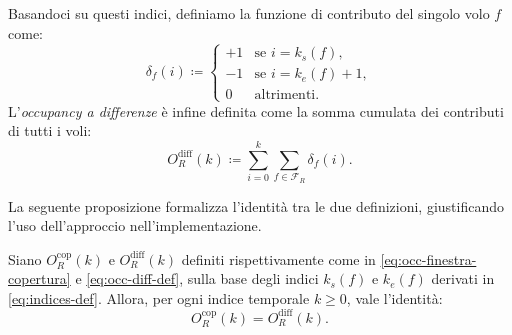 Basandoci su questi indici, definiamo la funzione di contributo del singolo volo \(f\) come:
\begin{equation*}
    \delta_f(i) \coloneqq
    \begin{cases}
    +1 & \text{se } i = k_s(f), \\
    -1 & \text{se } i = k_e(f) + 1, \\
    0  & \text{altrimenti}.
    \end{cases}
\end{equation*}
L'\emph{occupancy a differenze} è infine definita come la somma cumulata dei contributi di tutti i voli:
\begin{equation}
    \label{eq:occ-diff-def}
    O_R^{\text{diff}}(k) \coloneqq \sum_{i=0}^k \sum_{f \in \mathcal{F}_R} \delta_f(i).
\end{equation}

La seguente proposizione formalizza l'identità tra le due definizioni, giustificando l'uso dell'approccio nell'implementazione.
    
\begin{proposition}
\label{prop:occupancy-equivalence}
Siano \(O_R^{\text{cop}}(k)\) e \(O_R^{\text{diff}}(k)\) definiti rispettivamente come in \eqref{eq:occ-finestra-copertura} e \eqref{eq:occ-diff-def}, sulla base degli indici \(k_s(f)\) e \(k_e(f)\) derivati in \eqref{eq:indices-def}.
Allora, per ogni indice temporale \(k \ge 0\), vale l'identità:
\begin{equation}
    O_R^{\text{cop}}(k) = O_R^{\text{diff}}(k).
\end{equation}
\end{proposition}

